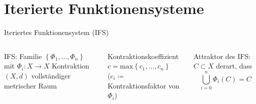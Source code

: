 \documentclass[10pt]{beamer}
\renewcommand{\max}{\text{max}}
\begin{document}
\section{Iterierte Funktionensysteme}

\begin{frame}{Iteriertes Funktionensystem (IFS)}
  \begin{columns}[T,onlytextwidth]
      \alert{IFS}: Familie \( \left \{ \Phi_1, \dots, \Phi_n \right \} \) mit \( \Phi_i : X \to X \) Kontraktion \\
      \scriptsize{\( (X,d) \) vollständiger metrischer Raum}
    
      \normalsize{}
      \alert{Kontraktionskoeffizient} \( c = \max\left \{ c_1, \dots, c_n \right \} \) \\
      \scriptsize{(\( c_i \coloneqq \) Kontraktionsfaktor von \( \Phi_i \))}
    
      \normalsize{}
      \alert{Attraktor} des IFS:\@ \( C \subset X \) derart, dass
      \begin{equation*}
        \bigcup_{i=0}^n \Phi_i(C) = C
      \end{equation*}


\end{columns}
\end{frame}
\end{document}

